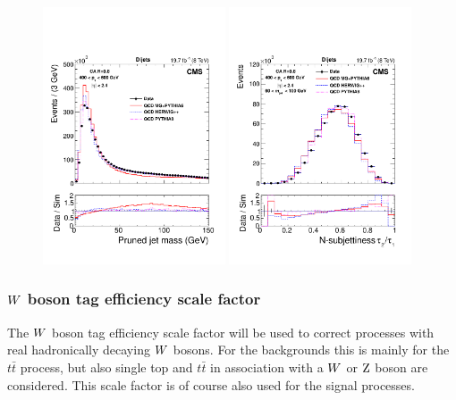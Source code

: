\begin{figure}[htpb]
  \centering
  \includegraphics[width=0.48\textwidth]{figures/razor_wtag/substructure_pas_mass_2}
  \includegraphics[width=0.48\textwidth]{figures/razor_wtag/substructure_pas_tau21_aftermass_2}
  \caption{ %
  \label{fig:boost_wtag_data_sim}}  
\end{figure}

\subsubsection{\texorpdfstring{$W$}{W} boson tag efficiency scale factor \label{sec:wtag_eff_sf}}

The $W$ boson tag efficiency scale factor will be used to correct processes with real
hadronically decaying $W$ bosons. For the backgrounds this is mainly for the $t\bar{t}$ process,
but also single top and $t\bar{t}$ in association with a $W$ or $\mathrm{Z}$ boson are considered. This
scale factor is of course also used for the signal processes. 

